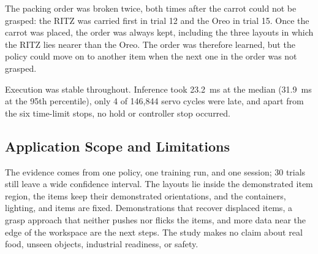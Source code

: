 The packing order was broken twice, both times after the carrot could not be
grasped: the RITZ was carried first in trial 12 and the Oreo in trial 15.
Once the carrot was placed, the order was always kept, including the three
layouts in which the RITZ lies nearer than the Oreo. The order was therefore
learned, but the policy could move on to another item when the next one in
the order was not grasped.

Execution was stable throughout. Inference took 23.2~ms at the median
(31.9~ms at the 95th percentile), only 4 of 146{,}844 servo cycles were late,
and apart from the six time-limit stops, no hold or controller stop occurred.

\subsection{Application Scope and Limitations}
\label{sec:limitations}
The evidence comes from one policy, one training run, and one session; 30
trials still leave a wide confidence interval. The layouts lie inside the
demonstrated item region, the items keep their demonstrated orientations, and
the containers, lighting, and items are fixed. Demonstrations that recover
displaced items, a grasp approach that neither pushes nor flicks the items,
and more data near the edge of the workspace are the next steps. The study
makes no claim about real food, unseen objects, industrial readiness, or
safety.
